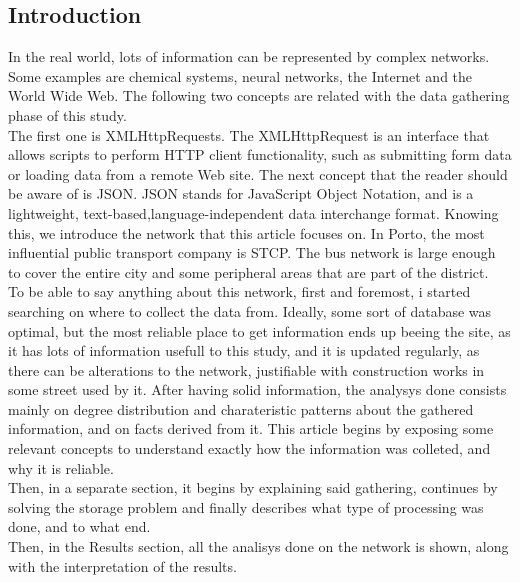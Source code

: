 \documentclass[12pt]{article}
\begin{document}
\begin{multicols}{2}
\section{Introduction}
In the real world, lots of information can be represented by complex networks. Some examples are chemical systems, neural networks, the Internet and the World Wide Web\cite{boccaletti2006complex}.
The following two concepts are related with the data gathering phase of this study.\\
The first one is XMLHttpRequests. The XMLHttpRequest is an interface that allows scripts to perform HTTP client functionality, such as submitting form data or loading data from a remote Web site\cite{van2007xmlhttprequest}.
The next concept that the reader should be aware of is JSON. JSON stands for JavaScript Object Notation, and is a lightweight, text-based,language-independent data interchange format\cite{crockford2006application}. Knowing this, we introduce the network that this article focuses on.
In Porto, the most influential public transport company is STCP. The bus network is large enough to cover the entire city and some peripheral areas that are part of the district.\\
To be able to say anything about this network, first and foremost, i started searching on where to collect the data from. Ideally, some sort of database was optimal, but the most reliable place to get information ends up beeing the site, as it has lots of information usefull to this study, and it is updated regularly, as there can be alterations to the network, justifiable with construction works in some street used by it.
After having solid information, the analysys done consists mainly on degree distribution and charateristic patterns about the gathered information, and on facts derived from it.
This article begins by exposing some relevant concepts to understand exactly how the information was colleted, and why it is reliable.\\
Then, in a separate section, it begins by explaining said gathering, continues by solving the storage problem and finally describes what type of processing was done, and to what end.\\
Then, in the Results section, all the analisys done on the network is shown, along with the interpretation of the results.


\end{multicols}
\end{document}

